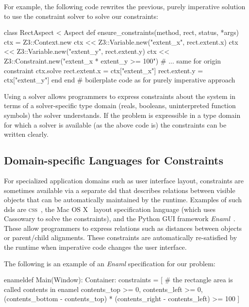 For example, the following code rewrites the previous, purely imperative
solution to use the \zthree constraint solver to solve our
constraints:
\begin{code}
class RectAspect < Aspect
  def ensure_constraints(method, rect, status, *args)
    ctx = Z3::Context.new
    ctx << Z3::Variable.new("extent_x", rect.extent.x)
    ctx << Z3::Variable.new("extent_y", rect.extent.y)
    ctx << Z3::Constraint.new("extent_x * extent_y >= 100")
    # ... same for origin constraint
    ctx.solve
    rect.extent.x = ctx["extent_x"]
    rect.extent.y = ctx["extent_y"]
  end
end
# boilerplate code as for purely imperative approach
\end{code}

Using a solver allows programmers to express constraints about the
system in terms of a solver-specific type domain (\eg reals, booleans,
uninterpreted function symbols) the solver understands. If the problem
is expressible in a type domain for which a solver is available (as
the above code is) the constraints can be written clearly.

\subsection{Domain-specific Languages for Constraints}

For specialized application domains such as user interface layout,
constraints are sometimes available via a separate \ac{dsl} that
describes relations between visible objects that can be automatically
maintained by the runtime.  Examples of such \acp{dsl} are
\textsc{css}~\cite{lie-css-book}, the Mac OS
X~\cite{AppleCocoaAutoLayout} layout specification language (which
uses Cassowary to solve the constraints), and the Python GUI framework
\emph{Enaml}~\cite{Enaml}. These allow programmers to express
relations such as distances between objects or parent/child
alignments. These constraints are automatically re-satisfied by the
runtime when imperative code changes the user interface.

The following is an example of an \emph{Enaml} specification for our
problem:
\begin{code}[language=python]
enameldef Main(Window):
    Container:
        constraints = [
            # the rectangle area is called contents in enamel
            contents_top >= 0, contents_left >= 0,
            (contents_bottom - contents_top) *
              (contents_right - contents_left) >= 100
        ]
\end{code}

